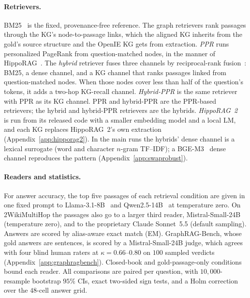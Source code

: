 \documentclass[11pt]{article}
\begin{document}
\paragraph{Retrievers.} BM25~\citep{robertson2009bm25} is the fixed, provenance-free reference. The graph retrievers rank passages through the KG's node-to-passage links, which the aligned KG inherits from the gold's source structure and the OpenIE KG gets from extraction. \emph{PPR} runs personalized PageRank from question-matched nodes, in the manner of HippoRAG~\citep{gutierrez2024hipporag}. The \emph{hybrid} retriever fuses three channels by reciprocal-rank fusion~\citep{cormack2009rrf}: BM25, a dense channel, and a KG channel that ranks passages linked from question-matched nodes. When those nodes cover less than half of the question's tokens, it adds a two-hop KG-recall channel. \emph{Hybrid-PPR} is the same retriever with PPR as its KG channel. PPR and hybrid-PPR are the PPR-based retrievers; the hybrid and hybrid-PPR retrievers are the hybrids. \emph{HippoRAG~2}~\citep{gutierrez2025hipporag2} is run from its released code with a smaller embedding model and a local LM, and each KG replaces HippoRAG~2's own extraction (Appendix~\ref{app:hipporag2}). In the main runs the hybrids' dense channel is a lexical surrogate (word and character $n$-gram TF--IDF); a BGE-M3~\citep{chen2024bgem3} dense channel reproduces the pattern (Appendix~\ref{app:swaprobust}).

\paragraph{Readers and statistics.} For answer accuracy, the top five passages of each retrieval condition are given in one fixed prompt to Llama-3.1-8B~\citep{grattafiori2024llama3} and Qwen2.5-14B~\citep{qwen2025qwen25} at temperature zero. On 2WikiMultiHop the passages also go to a larger third reader, Mistral-Small-24B (temperature zero), and to the proprietary Claude Sonnet~5.5 (default sampling). Answers are scored by alias-aware exact match (EM). GraphRAG-Bench, whose gold answers are sentences, is scored by a Mistral-Small-24B judge, which agrees with four blind human raters at $\kappa=0.66$--$0.80$ on $100$ sampled verdicts (Appendix~\ref{app:graphragbench}). Closed-book and gold-passage-only conditions bound each reader. All comparisons are paired per question, with $10{,}000$-resample bootstrap $95\%$ CIs, exact two-sided sign tests, and a Holm correction~\citep{holm1979} over the $48$-cell answer grid.
\end{document}

